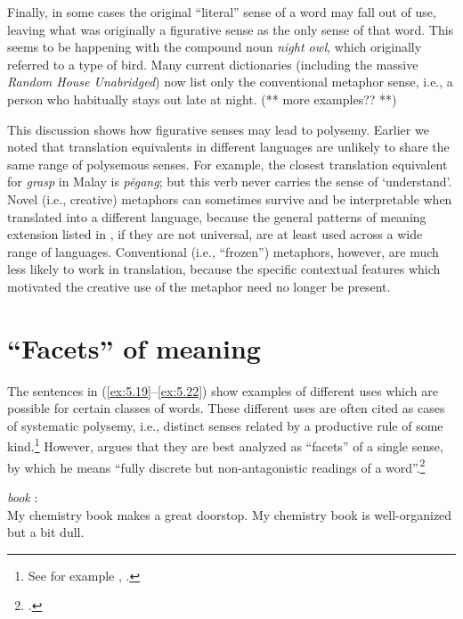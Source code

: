 Finally, in some cases the original “literal” sense of a word may fall out of use, leaving what was originally a figurative sense as the only sense of that word. This seems to be happening with the compound noun \textit{night owl}, which originally referred to a type of bird. Many current dictionaries (including the massive \textit{Random House Unabridged}) now list only the conventional metaphor sense, i.e., a person who habitually stays out late at night. (** more examples?? **)



This discussion shows how figurative senses may lead to polysemy. Earlier we noted that translation equivalents in different languages are unlikely to share the same range of polysemous senses. For example, the closest translation equivalent for \textit{grasp} in Malay is \textit{pĕgang}; but this verb never carries the sense of ‘understand’. Novel (i.e., creative) metaphors can sometimes survive and be interpretable when translated into a different language, because the general patterns of meaning extension listed in , if they are not universal, are at least used across a wide range of languages. Conventional (i.e., “frozen”) metaphors, however, are much less likely to work in translation, because the specific contextual features which motivated the creative use of the metaphor need no longer be present. 


\section{“Facets” of meaning}\label{sec:} %

The sentences in (\ref{ex:5.19}--\ref{ex:5.22}) show examples of different uses which are possible for certain classes of words. These different uses are often cited as cases of systematic polysemy, i.e., distinct senses related by a productive rule of some kind.\footnote{See for example \citet{Pustejovsky1995}, \citet{NunbergZaenen1992}.} However, \citet{Cruse2000,Cruse2004} argues that they are best analyzed as “facets” of a single sense, by which he means “fully discrete but non-antagonistic readings of a word”.\footnote{\citet[116]{Cruse2000}.}

\settowidth{}
\ea  \label{ex:5.19}
\textit{book} \citep{Cruse2004}:\\
\ea My chemistry book makes a great doorstop.            
\ex My chemistry book is well-organized but a bit dull.  
                       \z
\z

